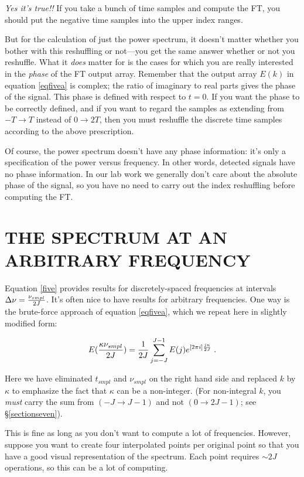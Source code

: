 \documentclass[psfig,preprint]{aastex}
\begin{document}
	{\it Yes it's true!!} If you take a bunch of time samples and
compute the FT, you should put the negative time samples into the upper
index ranges. 

	But for the calculation of just the power spectrum, it doesn't
matter whether you bother with this reshuffling or not---you get the
same answer whether or not you reshuffle.  What it {\it does} matter for
is the cases for which you are really interested in the {\it phase} of
the FT output array.  Remember that the output array $E(k)$ in equation
\ref{eqfivea} is complex; the ratio of imaginary to real parts gives the
phase of the signal.  This phase is defined with respect to $t=0$.  If
you want the phase to be correctly defined, and if you want to regard
the samples as extending from $-T \rightarrow T$ instead of $0
\rightarrow 2T$, then you must reshuffle the discrete time samples
according to the above prescription. 

	Of course, the power spectrum doesn't have any phase
information: it's only a specification of the power versus frequency. 
In other words, detected signals have no phase information.  In our lab
work we generally don't care about the absolute phase of the signal, so
you have no need to carry out the index reshuffling before computing the
FT. 

\section{THE SPECTRUM AT AN ARBITRARY FREQUENCY}

	Equation \ref{five} provides results for discretely-spaced
frequencies at intervals $\Delta \nu = {\nu_{smpl} \over 2J}$. It's
often nice to have results for arbitrary frequencies. One way is the
brute-force approach  of equation \ref{eqfivea}, which we repeat here in
slightly modified form:

\begin{equation} \label{eqfiveb}
E({\kappa \nu_{smpl} \over 2J}) = {1 \over 2J} \sum_{j=-J}^{J-1}  E(j)
e^{[2 \pi i] {j\kappa \over 2J} } \; .
\end{equation}

\noindent Here we have eliminated $t_{smpl}$ and $\nu_{smpl}$ on the
right hand side and replaced $k$ by $\kappa$ to emphasize the fact that
$\kappa$ can be a non-integer. (For non-integral $k$, you {\it must}
carry the sum from $(-J \rightarrow J-1)$ and not $(0 \rightarrow
2J-1)$; see \S \ref{sectionseven}). 

	This is fine as long as you don't want to compute a lot of
frequencies. However, suppose you want to create four interpolated
points per original point so that you have a good visual representation
of the spectrum. Each point requires $\sim 2J$ operations, so this can
be a lot of computing.
\end{document}
